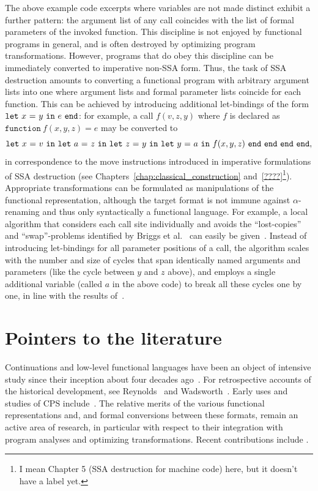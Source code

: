 The above example code excerpts where variables are not made distinct
exhibit a further pattern: the argument list of any call coincides
with the list of formal parameters of the invoked function. This
discipline is not enjoyed by functional programs in general, and is
often destroyed by optimizing program transformations. However,
programs that do obey this discipline can be immediately converted to
imperative non-SSA form. Thus, the task of SSA destruction amounts to
converting a functional program with arbitrary argument lists into one
where argument lists and formal parameter lists coincide for each
function. This can be achieved by introducing additional let-bindings
of the form $\mathtt{let}\ {x}\ \mathtt{=}\ {y}\ \mathtt{in}\ {e}\ \mathtt{end}$: for example, a call $f(v,z,y)$ where $f$
is declared as $\mathtt{function}\ f(x,y,z) = e$ may be converted to
$$\mathtt{let}\ {x}\ \mathtt{=}\ {v}\ \mathtt{in}\ {\mathtt{let}\ {a}\ \mathtt{=}\ {z}\ \mathtt{in}\ {\mathtt{let}\ {z}\ \mathtt{=}\ {y}\ \mathtt{in}\ {\mathtt{let}\ {y}\ \mathtt{=}\ {a}\ \mathtt{in}\ {f(x,y,z)}\ \mathtt{end}}\ \mathtt{end}}\ \mathtt{end}}\ \mathtt{end},$$ in
correspondence to the move instructions introduced in imperative
formulations of SSA destruction (see
Chapters~\ref{chap:classical_construction} and~\ref{????}\footnote{I
mean Chapter 5 (SSA destruction for machine code) here, but it doesn't
have a label yet.}). Appropriate transformations can be formulated as
manipulations of the functional representation, although the target
format is not immune against $\alpha$-renaming and thus only
syntactically a functional language. For example, a local algorithm
that considers each call site individually and avoids the
``lost-copies'' and ``swap''-problems identified by Briggs et
al.~\cite{DBLP:journals/spe/BriggsCHS98} can easily be
given~\cite{DBLP:journals/entcs/Beringer07}. Instead of introducing
let-bindings for all parameter positions of a call, the algorithm
scales with the number and size of cycles that span identically named
arguments and parameters (like the cycle between $y$ and $z$ above),
and employs a single additional variable (called $a$ in the above
code) to break all these cycles one by one, in line with the results
of~\cite{May}.


\section{Pointers to the literature}
\label{section:Part1:Semantics:Literature}

Continuations and low-level functional languages have been an object
of intensive study since their inception about four decades
ago~\cite{vanWijngaarden1966,Landin1965}.  For retrospective accounts
of the historical development, see Reynolds~\cite{Reynolds:LSC1993}
and Wadsworth~\cite{Wadsworth00}. Early uses and studies of CPS
include~\cite{Reynolds:1972,Plotkin75}.  The relative merits of the
various functional representations and, and formal conversions between
these formats, remain an active area of research, in particular with
respect to their integration with program analyses and optimizing
transformations.  Recent contributions include
\cite{DBLP:journals/jfp/DanvyMN07,DBLP:journals/lisp/Reppy02,DBLP:conf/icfp/Kennedy07}.

